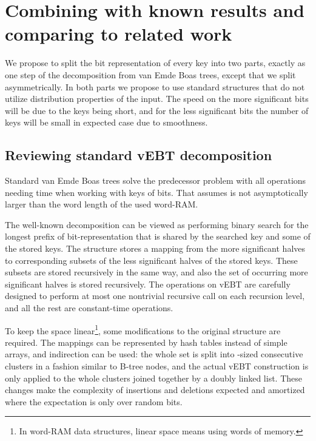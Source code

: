 \documentclass[
submission
, nomarks
]{dmtcs-episciences}
\theoremstyle{plain}
\theoremstyle{definition}
\theoremstyle{remark}
\theoremstyle{plain}
\theoremstyle{plain}
\begin{document}
\section{Combining with known results and comparing to related work \label{sec:main-results}}

We propose to split the bit representation of every key into two parts,
exactly as one step of the decomposition from van Emde Boas trees,
except that we split asymmetrically. In both parts we propose to use
standard structures that do not utilize distribution properties of
the input. The speed on the more significant bits will be due to the
keys being short, and for the less significant bits the number of
keys will be small in expected case due to smoothness.

\subsection{Reviewing standard vEBT decomposition}

Standard van Emde Boas trees solve the predecessor problem with all
operations needing  time when working with keys of 
bits. That assumes  is not asymptotically larger than the word
length of the used word-RAM.

The well-known decomposition can be viewed as performing binary search
for the longest prefix of bit-representation that is shared by the
searched key and some of the stored keys. The structure stores a mapping
from the more significant halves to corresponding subsets of the less
significant halves of the stored keys. These subsets are stored recursively
in the same way, and also the set of occurring more significant halves
is stored recursively. The operations on vEBT are carefully designed
to perform at most one nontrivial recursive call on each recursion
level, and all the rest are constant-time operations.

To keep the space linear\footnote{In word-RAM data structures, linear space means using  words
of memory.}, some modifications to the original structure are required. The mappings
can be represented by hash tables instead of simple arrays, and indirection
can be used: the whole set is split into -sized consecutive
clusters in a fashion similar to B-tree nodes, and the actual vEBT construction
is only applied to the whole clusters joined together by a doubly
linked list. These changes make the complexity of insertions and deletions
expected and amortized where the expectation is only over random bits.
\end{document}

